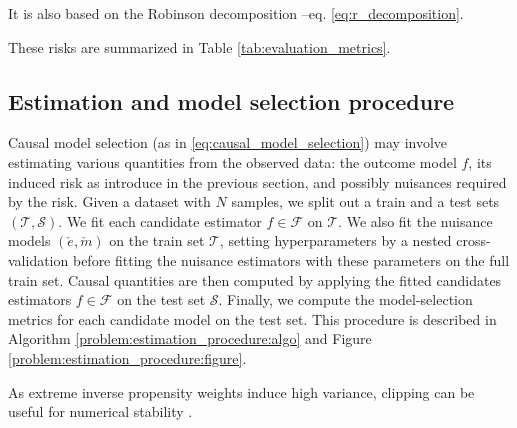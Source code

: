 \documentclass[french,12pt,twoside,a4paper]{book}
\begin{document}
It is also based on the Robinson decomposition --eq. \ref{eq:r_decomposition}. %

These risks are summarized in Table \ref{tab:evaluation_metrics}.


\subsection{Estimation and model selection procedure}\label{problem:estimation_procedure}

Causal model selection (as in
\autoref{eq:causal_model_selection}) may involve estimating various quantities
from the observed data: the outcome model $f$, its induced risk as
introduce in the previous section, and possibly nuisances required by the
risk.
Given a dataset with $N$ samples, we split out a train and a test sets
$(\mathcal{T}, \mathcal{S})$. We
fit each candidate estimator $f \in \mathcal{F}$ on $\mathcal{T}$. We also fit
the nuisance models $(\check e, \check m)$ on the train set
$\mathcal{T}$, setting hyperparameters by a nested
cross-validation before fitting the nuisance estimators with these parameters
on the full train set. Causal quantities are then computed by applying the fitted  candidates
estimators $f \in \mathcal{F}$ on the test set $\mathcal{S}$. Finally, we
compute the model-selection metrics for
each candidate model on the test set. This procedure is described in Algorithm
\ref{problem:estimation_procedure:algo} and Figure
\ref{problem:estimation_procedure:figure}.

As extreme inverse propensity weights induce high variance, clipping can be
useful for numerical stability
\citep{swaminathan_counterfactual_2015, ionides_truncated_2008}.
\end{document}
